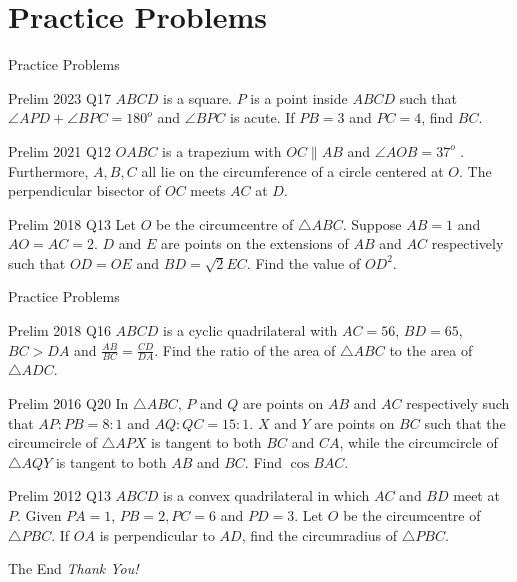 \documentclass{beamer}
\begin{document}
\section{Practice Problems}
\begin{frame}{Practice Problems}
	\begin{block}{Prelim 2023 Q17}
		$ABCD$ is a square. $P$ is a point inside $ABCD$ such that $\angle APD + \angle BPC = 180^o$ and  $\angle BPC$ is acute.  If $PB = 3$ and $PC = 4$, find $BC$.
	\end{block}
	\begin{block}{Prelim 2021 Q12}
		$OABC$ is a trapezium with $OC \parallel AB$ and $\angle AOB = 37^o$	. Furthermore, $A,B,C$ all lie on the circumference of a circle centered at $O$. The perpendicular bisector of $OC$ meets $AC$ at $D$.
	\end{block}
	\begin{block}{Prelim 2018 Q13}
		Let $O$ be the circumcentre of $\triangle ABC$. Suppose $AB = 1$ and $AO = AC = 2$. $D$ and $E$ are points on the extensions of $AB$ and $A C$ respectively such that $OD = OE $ and $BD = \sqrt{2} EC$. Find the value of $OD^2$.
	\end{block}
\end{frame}
\begin{frame}{Practice Problems}
	\begin{block} {Prelim 2018 Q16}
		$ABCD$ is a cyclic quadrilateral with $AC=56$, $BD=65$, $BC>DA$ and $\frac{AB}{BC} = \frac{CD}{DA}$. Find the ratio of the area of $\triangle ABC$ to the area of $\triangle ADC$.
	\end{block}
	\begin{block} {Prelim 2016 Q20}
		In $\triangle ABC$, $P$ and $Q$ are points on $AB$ and $AC$ respectively such that $AP:PB=8:1$ and $AQ:QC=15:1$.  $X$ and $Y$ are points on $BC$ such that the circumcircle of $\triangle APX$ is tangent to both $BC$ and $CA$, while the circumcircle of  $\triangle AQY$ is tangent to both $AB$ and $BC$. Find $\cos BAC$.
	\end{block}
	\begin{block}{Prelim 2012 Q13}
		$A B C D$ is a convex quadrilateral in which $A C$ and $B D$ meet at $P$. Given $P A=1$, $P B=2, P C=6$ and $P D=3$. Let $O$ be the circumcentre of $\triangle P B C$. If $O A$ is perpendicular to $A D$, find the circumradius of $\triangle P B C$.
	\end{block}
\end{frame}

\begin{frame}{The End}
	\centering \Large
	\emph{Thank You!}
\end{frame}
\end{document}

